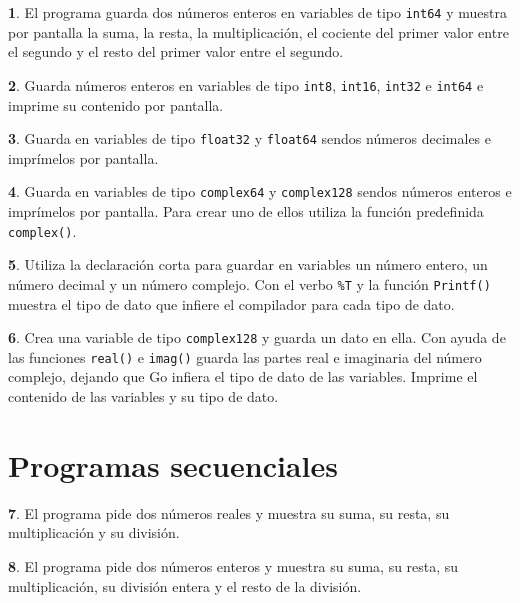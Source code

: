\documentclass[a4paper, 12pt]{article}
\theoremstyle{definition}
\newtheorem{ejer}{}[section]
\begin{document}
\begin{ejer}
El programa guarda dos números enteros en variables de tipo \verb|int64| y muestra por pantalla la suma, la resta, la multiplicación, el cociente del primer valor entre el segundo y el resto del primer valor entre el segundo.
\end{ejer}

\begin{ejer}
Guarda números enteros en variables de tipo \verb|int8|, \verb|int16|, \verb|int32| e \verb|int64| e imprime su contenido por pantalla.
\end{ejer}

\begin{ejer}
Guarda en variables de tipo \verb|float32| y \verb|float64| sendos números decimales e imprímelos por pantalla.
\end{ejer}

\begin{ejer}
Guarda en variables de tipo \verb|complex64| y \verb|complex128| sendos números enteros e imprímelos por pantalla. Para crear uno de ellos utiliza la función predefinida \verb|complex()|.
\end{ejer}

\begin{ejer}
Utiliza la declaración corta para guardar en variables un número entero, un número decimal y un número complejo. Con el verbo \verb|%T| y la función \verb|Printf()| muestra el tipo de dato que infiere el compilador para cada tipo de dato.
\end{ejer}

\begin{ejer}
Crea una variable de tipo \verb|complex128| y guarda un dato en ella. Con ayuda de las funciones \verb|real()| e \verb|imag()| guarda las partes real e imaginaria del número complejo, dejando que Go infiera el tipo de dato de las variables. Imprime el contenido de las variables y su tipo de dato.
\end{ejer}

\newpage

\section{Programas secuenciales}

\begin{ejer}
El programa pide dos números reales  y muestra su suma, su resta, su multiplicación y su división.
\end{ejer}

\begin{ejer}
El programa pide dos números enteros y muestra su suma, su resta, su multiplicación, su división entera y el resto de la división.
\end{ejer}
\end{document}
